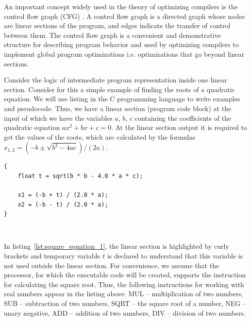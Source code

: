 \documentclass[
11pt,%
tightenlines,%
twoside,%
onecolumn,%
nofloats,%
nobibnotes,%
nofootinbib,%
superscriptaddress,%
noshowpacs,%
centertags]%
{revtex4}
\begin{document}
An important concept widely used in the theory of optimizing compilers is the control flow graph (CFG) \cite{Muchnick}.
A control flow graph is a directed graph whose nodes are linear sections of the program, and edges indicate the transfer of control between them.
The control flow graph is a convenient and demonstrative structure for describing program behavior and used by optimizing compilers to implement global program optimizations i.e. optimizations that go beyond linear sections.

Consider the logic of intermediate program representation inside one linear section.
Consider for this a simple example of finding the roots of a quadratic equation.
We will use listing in the C programming language to write examples and pseudocode.
Thus, we have a linear section (program code block) at the input of which we have the variables $a$, $b$, $c$ containing the coefficients of the quadratic equation $ax^2 + bx + c = 0$.
At the linear section output it is required to get the values of the roots, which are calculated by the formulas $x_{1,2} = (-b \pm \sqrt{b^2 - 4ac})/(2a)$.

\begin{lstlisting}[caption={The code block for calculating the roots of quadratic equation.},label={lst:square_equation_1}]
{
    float t = sqrt(b * b - 4.0 * a * c);
    
    x1 = (-b + t) / (2.0 * a);
    x2 = (-b - t) / (2.0 * a);
}
\end{lstlisting}

\

In listing~\ref{lst:square_equation_1}, the linear section is highlighted by curly brackets and temporary variable $t$ is declared to understand that this variable is not used outside the linear section.
For convenience, we assume that the processor, for which the executable code will be created, supports the instruction for calculating the square root.
Thus, the following instructions for working with real numbers appear in the listing above: MUL -- multiplication of two numbers, SUB -- subtraction of two numbers, SQRT -- the square root of a number, NEG -- unary negative, ADD -- addition of two numbers, DIV -- division of two numbers.
\end{document}
